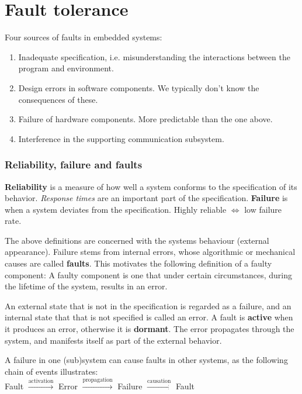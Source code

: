 \part{Fault tolerance}
Four sources of faults in embedded systems:
\begin{enumerate}
    \item Inadequate specification, i.e. misunderstanding the interactions between the program and environment.
    \item Design errors in software components. We typically don't know the consequences of these.
    \item Failure of hardware components. More predictable than the one above.
    \item Interference in the supporting communication subsystem.
\end{enumerate}

\section{Reliability, failure and faults}
\textbf{Reliability} is a measure of how well a system conforms to the specification of its behavior. \emph{Response times} are an important part of the specification. \textbf{Failure} is when a system deviates from the specification. Highly reliable $\iff$ low failure rate.

The above definitions are concerned with the systems behaviour (external appearance). Failure stems from internal errors, whose algorithmic or mechanical causes are called \textbf{faults}. This motivates the following definition of a faulty component: A faulty component is one that under certain circumstances, during the lifetime of the system, results in an error.

An external state that is not in the specification is regarded as a failure, and an internal state that that is not specified is called an error. A fault is \textbf{active} when it produces an error, otherwise it is \textbf{dormant}. The error propagates through the system, and manifests itself as part of the external behavior.

A failure in one (sub)system can cause faults in other systems, as the following chain of events illustrates:\\
Fault $\xrightarrow{\text{activation}}$ Error $\xrightarrow{\text{propagation}}$ Failure $\xrightarrow{\text{causation}}$ Fault\\

